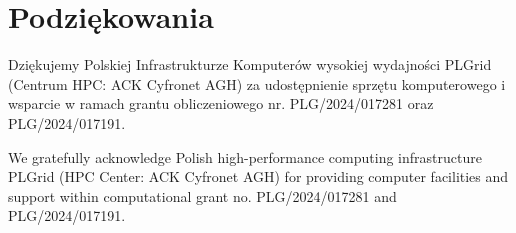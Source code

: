 \documentclass[data-science]{agh-wi} %
\begin{document}
\chapter{Podziękowania}

Dziękujemy Polskiej Infrastrukturze Komputerów wysokiej wydajności PLGrid (Centrum HPC: ACK Cyfronet AGH) za udostępnienie sprzętu komputerowego i wsparcie w ramach grantu obliczeniowego nr. PLG/2024/017281 oraz PLG/2024/017191.
\vspace*{1.5cm}

We gratefully acknowledge Polish high-performance computing infrastructure PLGrid (HPC Center: ACK Cyfronet AGH) for providing computer facilities and support within computational grant no. PLG/2024/017281 and PLG/2024/017191.


\printbibliography
\end{document}
